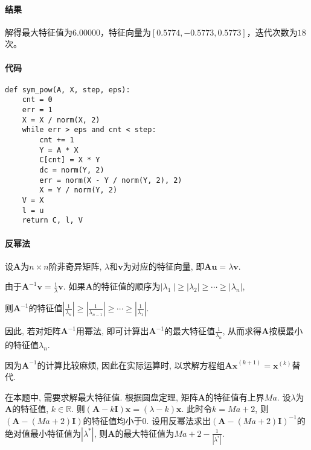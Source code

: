 \paragraph{结果}

解得最大特征值为$6.00000$，特征向量为$[0.5774, -0.5773, 0.5773]$，迭代次数为$18$次。

\paragraph{代码}

\begin{verbatim}
def sym_pow(A, X, step, eps):
    cnt = 0
    err = 1
    X = X / norm(X, 2)
    while err > eps and cnt < step:
        cnt += 1
        Y = A * X
        C[cnt] = X * Y
        dc = norm(Y, 2)
        err = norm(X - Y / norm(Y, 2), 2)
        X = Y / norm(Y, 2)
    V = X
    l = u
    return C, l, V
\end{verbatim}

\paragraph{反幂法}
设$\mathbf{A}$为$n\times n$阶非奇异矩阵, $\lambda$和$\mathbf{v}$为对应的特征向量, 即$\mathbf{Au} = \lambda \mathbf{v}$.

由于$\mathbf{A}^{-1}\mathbf{v} = \frac{1}{\lambda}\mathbf{v}$. 如果$\mathbf{A}$的特征值的顺序为$\left|\lambda_1\ \right| \geq \left|\lambda_2 \right| \geq \cdots \geq \left|\lambda_n \right|$,

则$\mathbf{A}^{-1}$的特征值$\left|\frac{1}{\lambda_n}  \right|\geq \left|\frac{1}{\lambda_{n-1}} \right| \geq \cdots \geq \left|\frac{1}{\lambda_1} \right|$.

因此, 若对矩阵$\mathbf{A}^{-1}$用幂法, 即可计算出$\mathbf{A}^{-1}$的最大特征值$\frac{1}{\lambda_n}$, 从而求得$\mathbf{A}$按模最小的特征值$\lambda_n$.

因为$\mathbf{A}^{-1}$的计算比较麻烦, 因此在实际运算时, 以求解方程组$\mathbf{Ax}^{\left(k+1 \right)} = \mathbf{x}^{\left(k\right)}$替代.

在本题中, 需要求解最大特征值. 根据圆盘定理, 矩阵$\textbf{A}$的特征值有上界$Ma$. 设$\lambda$为$\textbf{A}$的特征值, $k\in \mathbb{R}$. 则$\left(\mathbf{A}-k\mathbf{I}\right)\mathbf{x} = \left(\lambda - k\right) \mathbf{x}$. 此时令$k = Ma + 2$, 则$\left(\mathbf{A} - \left(Ma+2\right)\mathbf{I}\right)$的特征值均小于$0$. 设用反幂法求出$\left(\mathbf{A} - \left(Ma+2\right)\mathbf{I}\right)^{-1}$的绝对值最小特征值为$\left|\lambda^{*}\right|$, 则$\textbf{A}$的最大特征值为$Ma+2-\frac{1}{\left|\lambda^{*} \right|}$.

